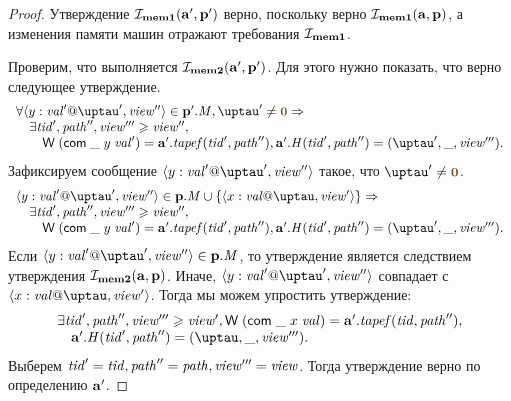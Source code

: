 \begin{proof}
Утверждение $\mathcal{I}_{\rm \bf mem1}(\mathbf{a}', \mathbf{p}')$ верно, поскольку верно $\mathcal{I}_{\rm \bf mem1}(\mathbf{a}, \mathbf{p})$, а изменения памяти машин
отражают требования $\mathcal{I}_{\rm \bf mem1}$.

Проверим, что выполняется $\mathcal{I}_{\rm \bf mem2}(\mathbf{a}', \mathbf{p}')$. Для этого нужно показать, что верно следующее утверждение.
  \[\begin{array}{l}
  \forall \writeEvt{y}{\stval'}{\tau'}{\R''} \in \p'.\Mprom, \tau' \not = \tstamp{0} => \\
  \quad \exists \tId', \cpath'', \R''' \ge \R'', \\
  \quad \quad \tapeWrite{(\tapeWriteCommitted{\_}{y}{\stval'})} = \aT'.\tapef(\tId', \cpath''),
        \aT'.\hmap(\tId', \cpath'') = (\tau', \_, \R'''). \\
  \end{array}\]
Зафиксируем сообщение $\writeEvt{y}{\stval'}{\tau'}{\R''}$ такое, что $\tau' \not = \tstamp{0}$.
  \[\begin{array}{l}
  \writeEvt{y}{\stval'}{\tau'}{\R''} \in \p.\Mprom \cup \{\writeEvt{x}{\stval}{\tau}{\R'}\} => \\
  \quad \exists \tId', \cpath'', \R''' \ge \R'', \\
  \quad \quad \tapeWrite{(\tapeWriteCommitted{\_}{y}{\stval'})} = \aT'.\tapef(\tId', \cpath''),
        \aT'.\hmap(\tId', \cpath'') = (\tau', \_, \R'''). \\
  \end{array}\]
Если $\writeEvt{y}{\stval'}{\tau'}{\R''} \in \p.\Mprom$, то утверждение является следствием утверждения $\mathcal{I}_{\rm \bf mem2}(\mathbf{a}, \mathbf{p})$.
Иначе, $\writeEvt{y}{\stval'}{\tau'}{\R''}$ совпадает с $\writeEvt{x}{\stval}{\tau}{\R'}$.
Тогда мы можем упростить утверждение:
      \[\begin{array}{l}
    \exists \tId', \cpath'', \R''' \ge \R',
      \tapeWrite{(\tapeWriteCommitted{\_}{x}{\stval})} = \aT'.\tapef(\tId, \cpath''), \\
      \quad \aT'.\hmap(\tId', \cpath'') = (\tau, \_, \R'''). \\
      \end{array}\]
Выберем $\mathit{tid}' = \mathit{tid}, \mathit{path}'' = \mathit{path}, \mathit{view}''' = \mathit{view}$. Тогда утверждение верно по определению $\mathbf{a}'$.
\end{proof}
